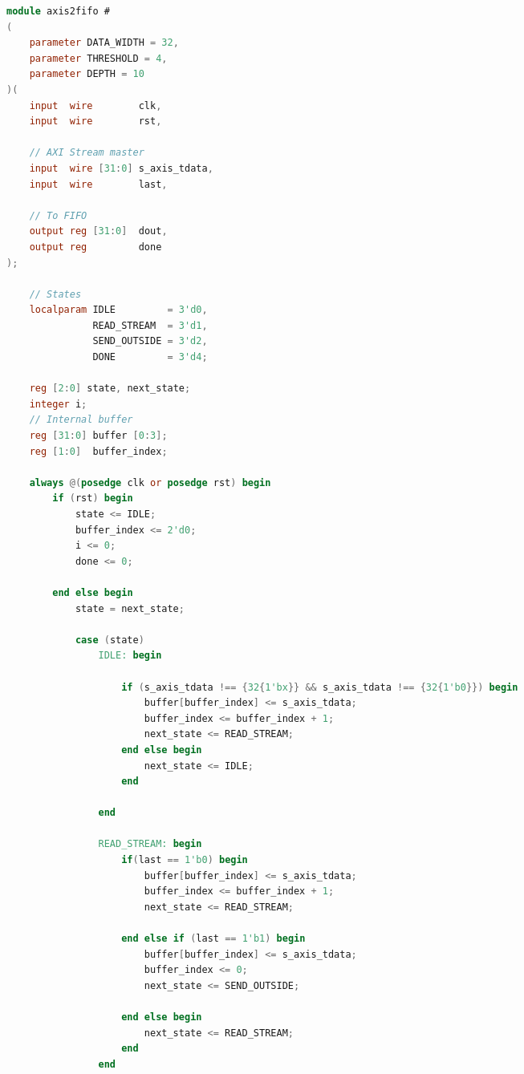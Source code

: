 \begin{adjustwidth}{1.5cm}{}
\begin{lstlisting}[language=verilog,frame=single,caption={Código fuente en Verilog del módulo conversor de AXI al formato de datos origen},showstringspaces=false,label=lst:verilogAxis2fifo]
module axis2fifo #
(
    parameter DATA_WIDTH = 32,
    parameter THRESHOLD = 4,
    parameter DEPTH = 10
)(
    input  wire        clk,
    input  wire        rst,

    // AXI Stream master
    input  wire [31:0] s_axis_tdata,
    input  wire        last,

    // To FIFO
    output reg [31:0]  dout,
    output reg         done
);

    // States
    localparam IDLE         = 3'd0,
               READ_STREAM  = 3'd1,
               SEND_OUTSIDE = 3'd2,
               DONE         = 3'd4;

    reg [2:0] state, next_state;
	integer i;
    // Internal buffer
    reg [31:0] buffer [0:3];
    reg [1:0]  buffer_index;

    always @(posedge clk or posedge rst) begin
        if (rst) begin
            state <= IDLE;
            buffer_index <= 2'd0;
            i <= 0;
            done <= 0;
            
        end else begin
            state = next_state;
            
            case (state)
                IDLE: begin
                    
                    if (s_axis_tdata !== {32{1'bx}} && s_axis_tdata !== {32{1'b0}}) begin
                        buffer[buffer_index] <= s_axis_tdata;
                        buffer_index <= buffer_index + 1;
                        next_state <= READ_STREAM;
                    end else begin
                        next_state <= IDLE;
                    end
                    
                end
        
            	READ_STREAM: begin
                    if(last == 1'b0) begin
                        buffer[buffer_index] <= s_axis_tdata;
                        buffer_index <= buffer_index + 1;
                        next_state <= READ_STREAM;
                        
                    end else if (last == 1'b1) begin
                        buffer[buffer_index] <= s_axis_tdata;
                        buffer_index <= 0;
                        next_state <= SEND_OUTSIDE;
                        
                    end else begin
                        next_state <= READ_STREAM;
                    end
                end
                

\end{lstlisting}
\end{adjustwidth}
